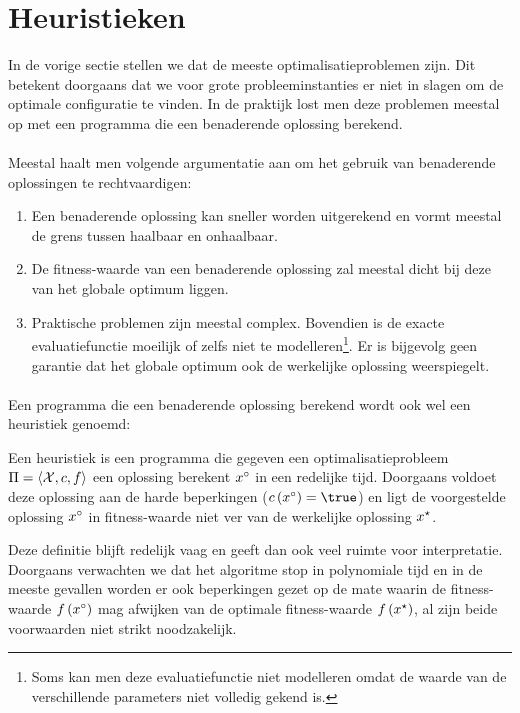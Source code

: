 \section{Heuristieken}

In de vorige sectie stellen we dat de meeste optimalisatieproblemen  zijn. Dit betekent doorgaans dat we voor grote probleeminstanties er niet in slagen om de optimale configuratie te vinden. In de praktijk lost men deze problemen meestal op met een programma die een benaderende oplossing berekend.

\paragraph{}
Meestal haalt men volgende argumentatie aan om het gebruik van benaderende oplossingen te rechtvaardigen:%
\begin{enumerate}
 \item Een benaderende oplossing kan sneller worden uitgerekend en vormt meestal de grens tussen haalbaar en onhaalbaar.
 \item De fitness-waarde van een benaderende oplossing zal meestal dicht bij deze van het globale optimum liggen.
 \item Praktische problemen zijn meestal complex. Bovendien is de exacte evaluatiefunctie moeilijk of zelfs niet te modelleren\footnote{Soms kan men deze evaluatiefunctie niet modelleren omdat de waarde van de verschillende parameters niet volledig gekend is.}. Er is bijgevolg geen garantie dat het globale optimum ook de werkelijke oplossing weerspiegelt.
\end{enumerate}

\paragraph{}
Een programma die een benaderende oplossing berekend wordt ook wel een heuristiek genoemd:

\begin{definition}[Heuristiek]
Een heuristiek is een programma die gegeven een optimalisatieprobleem $\Pi=\left\langle \mathcal{X},c,f\right\rangle$ een oplossing berekent $x^{\circ}$ in een redelijke tijd. Doorgaans voldoet deze oplossing aan de harde beperkingen ($\fun{\hcfun}{\goodSol}=\true$) en ligt de voorgestelde oplossing $x^{\circ}$ in fitness-waarde niet ver van de werkelijke oplossing $x^{\star}$.
\end{definition}

Deze definitie blijft redelijk vaag en geeft dan ook veel ruimte voor interpretatie. Doorgaans verwachten we dat het algoritme stop in polynomiale tijd en in de meeste gevallen worden er ook beperkingen gezet op de mate waarin de fitness-waarde $f\left(x^{\circ}\right)$ mag afwijken van de optimale fitness-waarde $f\left(x^{\star}\right)$, al zijn beide voorwaarden niet strikt noodzakelijk.